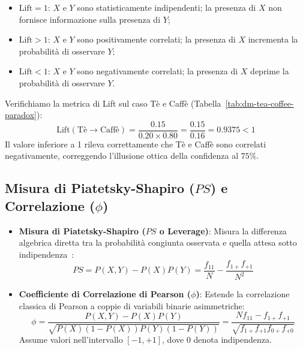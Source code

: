 \begin{itemize}
    \item $\mathrm{Lift} = 1$: $X$ e $Y$ sono statisticamente indipendenti; la presenza di $X$ non fornisce informazione sulla presenza di $Y$;
    \item $\mathrm{Lift} > 1$: $X$ e $Y$ sono positivamente correlati; la presenza di $X$ incrementa la probabilità di osservare $Y$;
    \item $\mathrm{Lift} < 1$: $X$ e $Y$ sono negativamente correlati; la presenza di $X$ deprime la probabilità di osservare $Y$.
\end{itemize}

Verifichiamo la metrica di Lift sul caso Tè e Caffè (Tabella~\ref{tab:dm-tea-coffee-paradox}):
\begin{equation}
\mathrm{Lift}(\text{Tè} \longrightarrow \text{Caffè}) = \frac{0.15}{0.20 \times 0.80} = \frac{0.15}{0.16} = 0.9375 < 1
\end{equation}
Il valore inferiore a 1 rileva correttamente che Tè e Caffè sono correlati negativamente, correggendo l'illusione ottica della confidenza al $75\%$.

\FloatBarrier
\subsection{Misura di Piatetsky-Shapiro ($PS$) e Correlazione ($\phi$)}
\begin{itemize}
    \item \textbf{Misura di Piatetsky-Shapiro ($PS$ o Leverage)}: Misura la differenza algebrica diretta tra la probabilità congiunta osservata e quella attesa sotto indipendenza~\cite{piatetsky1991}:
    \begin{equation}
    \label{eq:dm-ps-leverage}
    PS = P(X, Y) - P(X)P(Y) = \frac{f_{11}}{N} - \frac{f_{1+} f_{+1}}{N^2}
    \end{equation}
    \item \textbf{Coefficiente di Correlazione di Pearson ($\phi$)}: Estende la correlazione classica di Pearson a coppie di variabili binarie asimmetriche:
    \begin{equation}
    \label{eq:dm-phi-correlation}
    \phi = \frac{P(X, Y) - P(X)P(Y)}{\sqrt{P(X)(1-P(X))P(Y)(1-P(Y))}} = \frac{N f_{11} - f_{1+} f_{+1}}{\sqrt{f_{1+} f_{+1} f_{0+} f_{+0}}}
    \end{equation}
    Assume valori nell'intervallo $[-1, +1]$, dove $0$ denota indipendenza.
\end{itemize}

